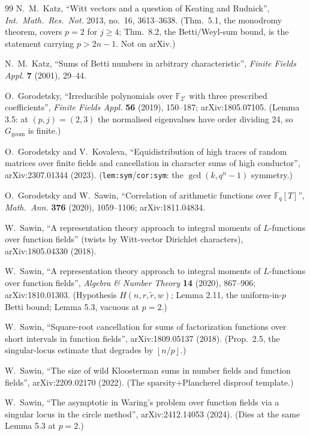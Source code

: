 \documentclass[10pt]{article}
\theoremstyle{plain}
\theoremstyle{definition}
\newcommand{\F}{\mathbb F}
\newcommand{\flr}[1]{\left\lfloor #1\right\rfloor}
\newcommand{\Ggeom}{G_{\mathrm{geom}}}
\begin{document}
\begin{thebibliography}{99}
N.~M.~Katz, ``Witt vectors and a question of Keating and Rudnick'',
\emph{Int.\ Math.\ Res.\ Not.} 2013, no.~16, 3613--3638. (Thm.~5.1, the
monodromy theorem, covers $p=2$ for $j\ge4$; Thm.~8.2, the Betti/Weyl-sum
bound, is the statement carrying $p>2n-1$. Not on arXiv.)

N.~M.~Katz, ``Sums of Betti numbers in arbitrary characteristic'',
\emph{Finite Fields Appl.} \textbf{7} (2001), 29--44.

O.~Gorodetsky, ``Irreducible polynomials over $\F_{2^r}$ with three prescribed
coefficients'', \emph{Finite Fields Appl.} \textbf{56} (2019), 150--187;
arXiv:1805.07105. (Lemma 3.5: at $(p,j)=(2,3)$ the normalised eigenvalues have
order dividing 24, so $\Ggeom$ is finite.)

O.~Gorodetsky and V.~Kovaleva, ``Equidistribution of high traces of random
matrices over finite fields and cancellation in character sums of high
conductor'', arXiv:2307.01344 (2023). (\texttt{lem:sym}/\texttt{cor:sym}: the
$\gcd(k,q^n-1)$ symmetry.)

O.~Gorodetsky and W.~Sawin, ``Correlation of arithmetic functions over
$\F_q[T]$'', \emph{Math.\ Ann.} \textbf{376} (2020), 1059--1106;
arXiv:1811.04834.

W.~Sawin, ``A representation theory approach to integral moments of
$L$-functions over function fields'' (twists by Witt-vector Dirichlet
characters), arXiv:1805.04330 (2018).

W.~Sawin, ``A representation theory approach to integral moments of
$L$-functions over function fields'', \emph{Algebra \& Number Theory}
\textbf{14} (2020), 867--906; arXiv:1810.01303. (Hypothesis
$H(n,r,\tilde r,w)$; Lemma 2.11, the uniform-in-$p$ Betti bound; Lemma 5.3,
vacuous at $p=2$.)

W.~Sawin, ``Square-root cancellation for sums of factorization functions over
short intervals in function fields'', arXiv:1809.05137 (2018). (Prop.~2.5, the
singular-locus estimate that degrades by $\flr{n/p}$.)

W.~Sawin, ``The size of wild Kloosterman sums in number fields and function
fields'', arXiv:2209.02170 (2022). (The sparsity$+$Plancherel disproof
template.)

W.~Sawin, ``The asymptotic in Waring's problem over function fields via a
singular locus in the circle method'', arXiv:2412.14053 (2024). (Dies at the
same Lemma 5.3 at $p=2$.)


\end{thebibliography}
\end{document}
